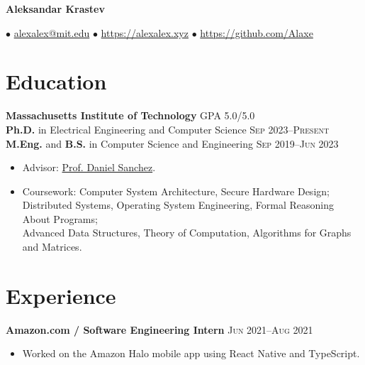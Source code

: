 \documentclass[letterpaper,11pt]{article}
\author{Aleksandar Krastev}
\begin{document}
\setlength{\belowdisplayskip}{\parskip}
\setlength{\belowdisplayshortskip}{\belowdisplayskip}
\setlength{\abovedisplayskip}{\parskip}
\setlength{\abovedisplayshortskip}{\abovedisplayskip}

\begin{center}
    \Huge \bf Aleksandar Krastev
\end{center}

\vspace{-\parskip}
$\bullet$ \href{mailto:alexalex@mit.edu}{alexalex@mit.edu} \hfill
$\bullet$ \href{https://alexalex.xyz}{https://alexalex.xyz} \hfill
$\bullet$ \href{https://github.com/Alaxe}{https://github.com/Alaxe} \hfill

\section*{Education}
\textbf{Massachusetts Institute of Technology}
\hfill
\textsc{GPA 5.0/5.0} \\
\textbf{Ph.D.} in Electrical Engineering and Computer Science
    \hfill \textsc{Sep 2023--Present} \\
\textbf{M.Eng.} and \textbf{B.S.} in Computer Science and Engineering
        \hfill \textsc{Sep 2019--Jun 2023}
\begin{itemize}
    \item Advisor: \href{https://people.csail.mit.edu/sanchez/}{Prof. Daniel
        Sanchez}.
    \item Coursework:
        Computer System Architecture,
        Secure Hardware Design;\\
        Distributed Systems,
        Operating System Engineering,
        Formal Reasoning About Programs;\\
        Advanced Data Structures,
        Theory of Computation,
        Algorithms for Graphs and Matrices.
\end{itemize}



\section*{Experience}

\textbf{Amazon.com / Software Engineering Intern}
\hfill
\textsc{Jun 2021--Aug 2021}
\begin{itemize}
    \item Worked on the Amazon Halo mobile app using React Native and TypeScript.
\end{itemize}
\end{document}

